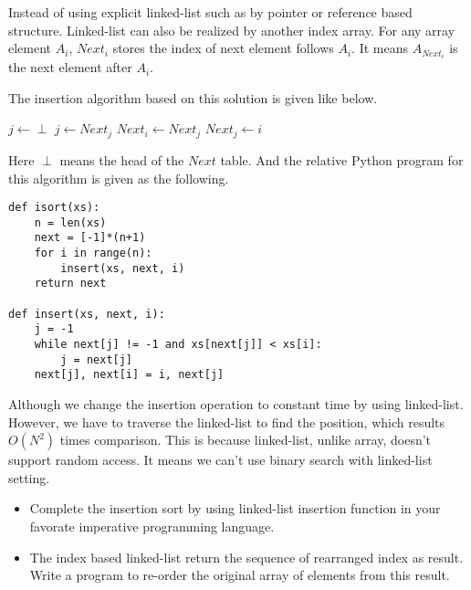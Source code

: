 \documentclass{article}
\begin{document}
Instead of using explicit linked-list such as by pointer or reference
based structure. Linked-list can also be realized by another index array.
For any array element $A_i$, $Next_i$ stores the index of next element
follows $A_i$. It means $A_{Next_i}$ is the next element after $A_i$.

The insertion algorithm based on this solution is given like below.

\begin{algorithmic}
  \State $j \gets \perp$
    \State $j \gets Next_j$
  \EndWhile
  \State $Next_i \gets Next_j$
  \State $Next_j \gets i$
\EndFunction
\end{algorithmic}

Here $\perp$ means the head of the $Next$ table. 
And the relative Python program for this algorithm is given as the following.

\lstset{language=Python}
\begin{lstlisting}
def isort(xs):
    n = len(xs)
    next = [-1]*(n+1)
    for i in range(n):
        insert(xs, next, i)
    return next

def insert(xs, next, i):
    j = -1
    while next[j] != -1 and xs[next[j]] < xs[i]:
        j = next[j]
    next[j], next[i] = i, next[j]
\end{lstlisting}

Although we change the insertion operation to constant time by using 
linked-list. However, we have to traverse the linked-list to find the
position, which results $O(N^2)$ times comparison. This is because
linked-list, unlike array, doesn't support random access. It means we
can't use binary search with linked-list setting.

\begin{Exercise}
\begin{itemize}
\item Complete the insertion sort by using linked-list insertion function
in your favorate imperative programming language.
\item The index based linked-list return the sequence of rearranged index
as result. Write a program to re-order the original array of elements from
this result.
\end{itemize}
\end{Exercise}

\end{document}
